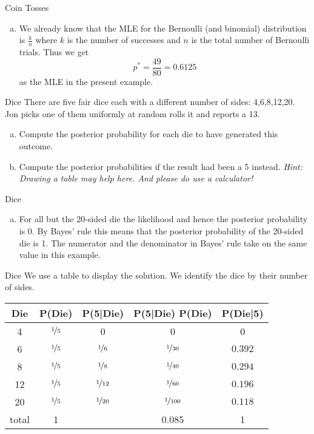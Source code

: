 \documentclass[14pt]{beamer}
\begin{document}
\begin{frame}{Coin Tosses}
\begin{enumerate}[b)]
\item We already know that the MLE for the Bernoulli (and binomial) distribution is 
$ \frac{k}{n} $ where $ k $ is the number of successes and $ n $ is the total number of Bernoulli trials.
Thus we get $$ p^{*}=\frac{49}{80} = 0.6125 $$ as the MLE in the present example.
\end{enumerate}
\end{frame}

\begin{frame}{Dice}
There are five fair dice each with a different number of sides: 4,6,8,12,20.
Jon picks one of them uniformly at random rolls it and reports a 13.
\begin{enumerate}[a)]
\item Compute the posterior probability for each die to have generated this outcome.
\item Compute the posterior probabilities if the result had been a 5 instead. \textit{Hint: Drawing a table
may help here. And please do use a calculator!}
\end{enumerate}
\end{frame}

\begin{frame}{Dice}
\begin{enumerate}[a)]
\item For all but the 20-sided die the likelihood and hence the posterior probability is 0. By Bayes' rule
this means that the posterior probability of the 20-sided die is 1. The numerator and the denominator
in Bayes' rule take on the same value in this example.
\end{enumerate}
\end{frame}

\begin{frame}{Dice}
\small
We use a table to display the solution. We identify the dice by their number of sides.
\begin{table}
\begin{tabular}{|c|c|c|c|c|}
\hline
Die	&	P(Die)		&	P(5|Die)			&	P(5|Die)	P(Die) & P(Die|5) \\
\hline
\hline
4	&$ \nicefrac{1}{5} $	&		0			&	0				&	0		\\
\hline
6	&$ \nicefrac{1}{5} $	&$ \nicefrac{1}{6} $		&$ \nicefrac{1}{30} $	&$ 0.392 $	\\
\hline
8	&$ \nicefrac{1}{5} $	&$ \nicefrac{1}{8} $		&$ \nicefrac{1}{40} $	&$ 0.294 $	\\
\hline
12	&$ \nicefrac{1}{5} $	&$ \nicefrac{1}{12} $	&$ \nicefrac{1}{60} $	&$ 0.196 $	\\
\hline
20	&$ \nicefrac{1}{5} $	&$ \nicefrac{1}{20} $	&$ \nicefrac{1}{100} $	&$ 0.118 $	\\
\hline
\hline
total&	1			&				&	0.085			&		1	\\
\hline
\end{tabular}
\end{table}
\end{frame}
\end{document}
